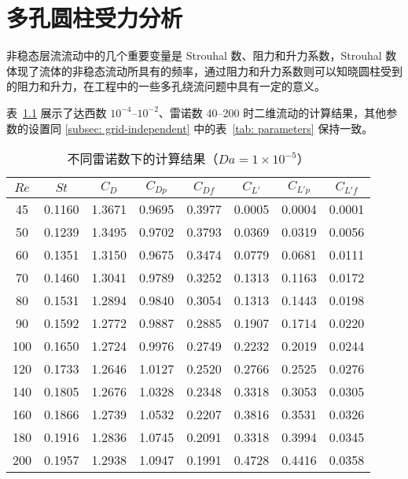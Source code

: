\chapter{多孔圆柱受力分析}\label{chap: force}

非稳态层流流动中的几个重要变量是 Strouhal 数、阻力和升力系数，Strouhal 数体现了流体的非稳态流动所具有的频率，通过阻力和升力系数则可以知晓圆柱受到的阻力和升力，在工程中的一些多孔绕流问题中具有一定的意义。

表~\ref{tab: results-1e-5} 展示了达西数 $10^{-4}$--$10^{-2}$、雷诺数 40--200 时二维流动的计算结果，其他参数的设置同 \ref{subsec: grid-independent} 中的表~\ref{tab: parameters} 保持一致。

\begin{table}[ht]
	\caption{不同雷诺数下的计算结果（$Da=1\times 10^{-5}$）}\label{tab: results-1e-5}
	\vspace{.5em}\centering\wuhao
	\begin{tabular}{*{8}{c}}
		\toprule[1.5pt]
		$Re$ & $St$ & $C_D$ & $C_{Dp}$ & $C_{Df}$ & $C_{L'}$ & $C_{L'p}$ & $C_{L'f}$ \\
		\midrule[1pt]
		45  & 0.1160 & 1.3671 & 0.9695 & 0.3977 & 0.0005 & 0.0004 & 0.0001 \\
		50  & 0.1239 & 1.3495 & 0.9702 & 0.3793 & 0.0369 & 0.0319 &	0.0056 \\
		60  & 0.1351 & 1.3150 & 0.9675 & 0.3474 & 0.0779 & 0.0681 & 0.0111 \\
		70  & 0.1460 & 1.3041 & 0.9789 & 0.3252 & 0.1313 & 0.1163 &	0.0172 \\
		80  & 0.1531 & 1.2894 &	0.9840 & 0.3054 & 0.1313 & 0.1443 &	0.0198 \\
		90  & 0.1592 & 1.2772 &	0.9887 & 0.2885 & 0.1907 & 0.1714 &	0.0220 \\
		100 & 0.1650 & 1.2724 &	0.9976 & 0.2749 & 0.2232 & 0.2019 &	0.0244 \\
		120 & 0.1733 & 1.2646 &	1.0127 & 0.2520 & 0.2766 & 0.2525 &	0.0276 \\
		140 & 0.1805 & 1.2676 &	1.0328 & 0.2348 & 0.3318 & 0.3053 &	0.0305 \\
		160 & 0.1866 & 1.2739 &	1.0532 & 0.2207 & 0.3816 & 0.3531 &	0.0326 \\
		180 & 0.1916 & 1.2836 &	1.0745 & 0.2091 & 0.3318 & 0.3994 &	0.0345 \\
		200 & 0.1957 & 1.2938 &	1.0947 & 0.1991 & 0.4728 & 0.4416 &	0.0358 \\
		\bottomrule[1.5pt]
	\end{tabular}
\end{table}

